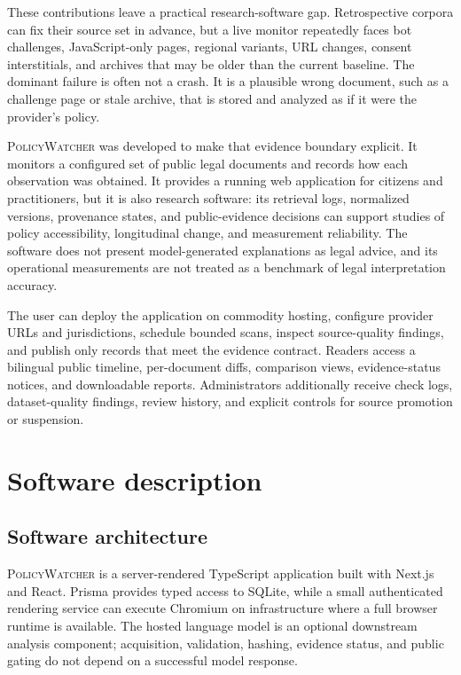\documentclass[preprint,12pt,a4paper]{elsarticle}
\newcommand{\pw}{\textsc{PolicyWatcher}}
\begin{document}
These contributions leave a practical research-software gap. Retrospective
corpora can fix their source set in advance, but a live monitor repeatedly faces
bot challenges, JavaScript-only pages, regional variants, URL changes, consent
interstitials, and archives that may be older than the current baseline. The
dominant failure is often not a crash. It is a plausible wrong document, such as
a challenge page or stale archive, that is stored and analyzed as if it were the
provider's policy.

\pw{} was developed to make that evidence boundary explicit. It monitors a
configured set of public legal documents and records how each observation was
obtained. It provides a running web application for citizens and practitioners,
but it is also research software: its retrieval logs, normalized versions,
provenance states, and public-evidence decisions can support studies of policy
accessibility, longitudinal change, and measurement reliability. The software
does not present model-generated explanations as legal advice, and its
operational measurements are not treated as a benchmark of legal interpretation
accuracy.

The user can deploy the application on commodity hosting, configure provider
URLs and jurisdictions, schedule bounded scans, inspect source-quality findings,
and publish only records that meet the evidence contract. Readers access a
bilingual public timeline, per-document diffs, comparison views, evidence-status
notices, and downloadable reports. Administrators additionally receive check
logs, dataset-quality findings, review history, and explicit controls for source
promotion or suspension.

\section{Software description}
\label{sec:description}

\subsection{Software architecture}

\pw{} is a server-rendered TypeScript application built with Next.js and React.
Prisma provides typed access to SQLite, while a small authenticated rendering
service can execute Chromium on infrastructure where a full browser runtime is
available. The hosted language model is an optional downstream analysis
component; acquisition, validation, hashing, evidence status, and public gating
do not depend on a successful model response.
\end{document}
